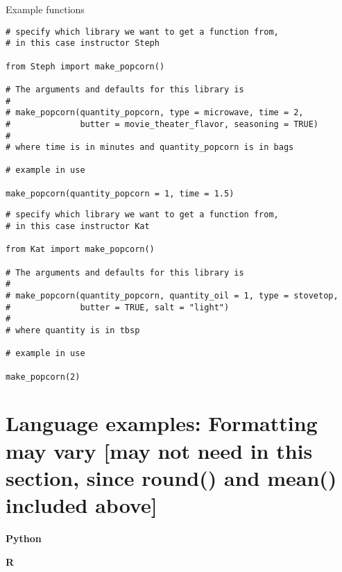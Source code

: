 \documentclass[
]{book}
\newenvironment{Shaded}{\begin{snugshade}}{\end{snugshade}}
\begin{document}
Example functions

\begin{verbatim}
# specify which library we want to get a function from, 
# in this case instructor Steph

from Steph import make_popcorn()

# The arguments and defaults for this library is
#
# make_popcorn(quantity_popcorn, type = microwave, time = 2, 
#              butter = movie_theater_flavor, seasoning = TRUE)
#
# where time is in minutes and quantity_popcorn is in bags

# example in use

make_popcorn(quantity_popcorn = 1, time = 1.5)
\end{verbatim}

\begin{verbatim}
# specify which library we want to get a function from, 
# in this case instructor Kat

from Kat import make_popcorn()

# The arguments and defaults for this library is
#
# make_popcorn(quantity_popcorn, quantity_oil = 1, type = stovetop, 
#              butter = TRUE, salt = "light")
#
# where quantity is in tbsp

# example in use

make_popcorn(2)
\end{verbatim}

\section{Language examples: Formatting may vary {[}may not need in this section, since round() and mean() included above{]}}\label{language-examples-formatting-may-vary-may-not-need-in-this-section-since-round-and-mean-included-above}

\textbf{Python}

\begin{Shaded}
\begin{Highlighting}[]

\end{Highlighting}
\end{Shaded}

\textbf{R}

\begin{Shaded}
\begin{Highlighting}[]

\end{Highlighting}
\end{Shaded}
\end{document}
